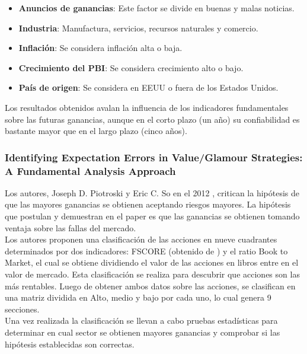 \begin{itemize}

\item \textbf{Anuncios de ganancias}: Este factor se divide en buenas y malas noticias.

\item \textbf{Industria}: Manufactura, servicios, recursos naturales y comercio.

\item \textbf{Inflación}: Se considera inflación alta o baja.

\item \textbf{Crecimiento del PBI}: Se considera crecimiento alto o bajo.

\item \textbf{País de origen}: Se considera en EEUU o fuera de los Estados Unidos.

\end{itemize}

Los resultados obtenidos avalan la influencia de los indicadores fundamentales sobre las futuras ganancias, aunque en el corto plazo (un año) su confiabilidad es bastante mayor que en el largo plazo (cinco años).\\

\subsubsection{Identifying Expectation Errors in Value/Glamour Strategies: A Fundamental Analysis Approach}

Los autores, Joseph D. Piotroski y Eric C. So en el 2012 \cite{Piotroski2012}, critican la hipótesis de que las mayores ganancias se obtienen aceptando riesgos mayores. La hipótesis que postulan y demuestran en el paper es que las ganancias se obtienen tomando ventaja sobre las fallas del mercado.\\

Los autores proponen una clasificación de las acciones en nueve cuadrantes determinados por dos indicadores: FSCORE (obtenido de \cite{Piotroski2000}) y el ratio Book to Market, el cual se obtiene dividiendo el valor de las acciones en libros entre en el valor de mercado. Esta clasificación se realiza para descubrir que acciones son las más rentables. Luego de obtener ambos datos sobre las acciones, se clasifican en una matriz dividida en Alto, medio y bajo por cada uno, lo cual genera 9 secciones.\\

Una vez realizada la clasificación se llevan a cabo pruebas estadísticas para determinar en cual sector se obtienen mayores ganancias y comprobar si las hipótesis establecidas son correctas.\\


